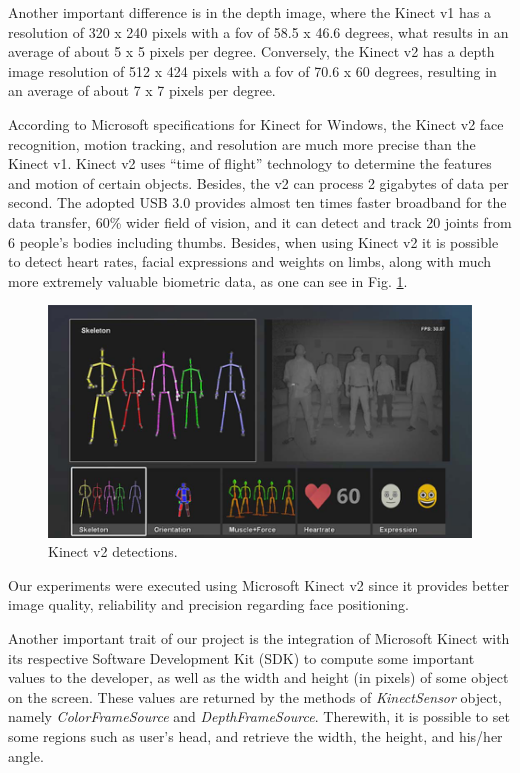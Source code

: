\documentclass[10pt, conference]{IEEEtran}
\begin{document}
	Another important difference is in the depth image, where the Kinect v1 has a resolution of 320 x 240 pixels with a fov of 58.5 x 46.6 degrees, what results in an average of about 5 x 5 pixels per degree. 
	Conversely, the Kinect v2 has a depth image resolution of 512 x 424 pixels with a fov of 70.6 x 60 degrees, resulting in an average of about 7 x 7 pixels per degree. 

	According to Microsoft specifications for Kinect for Windows, the Kinect v2 face recognition, motion tracking, and resolution are much more precise than the Kinect v1. 
    Kinect v2 uses ``time of flight'' technology to determine the features and motion of certain objects. 
	Besides, the v2 can process 2 gigabytes of data per second. The adopted USB 3.0 provides almost ten times faster broadband for the data transfer, 60\% wider field of vision, and it can detect and track 20 joints from 6 people’s bodies including thumbs. 
	Besides, when using Kinect v2 it is possible to detect heart rates, facial expressions and weights on limbs, along with much more extremely valuable biometric data, as one can see in Fig. \ref{fig:fig2}.

    \begin{figure}[t]
        \centering
        \includegraphics{figures/pic2.png}
        \caption{Kinect v2 detections.}
        \label{fig:fig2}
    \end{figure}

	Our experiments were executed using Microsoft Kinect v2 since it provides better image quality, reliability and precision regarding face positioning.

	Another important trait of our project is the integration of Microsoft Kinect with its respective Software Development Kit (SDK) to compute some important values to the developer, as well as the width and height (in pixels) of some object on the screen.
    These values are returned by the methods of \emph{KinectSensor} object, namely \emph{ColorFrameSource} and \emph{DepthFrameSource}.
	Therewith, it is possible to set some regions such as user's head, and retrieve the width, the height, and his/her angle.
\end{document}
